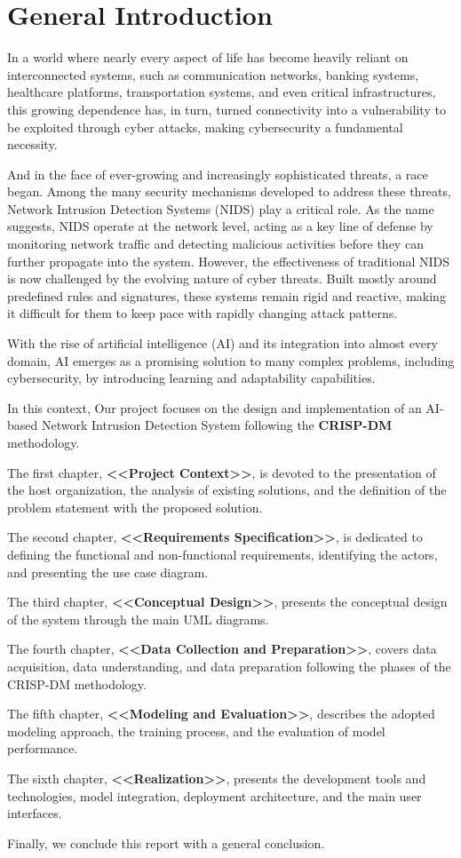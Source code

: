 
\chapter*{General Introduction}

\vspace{-0.9cm}
In a world where nearly every aspect of life has become heavily reliant on interconnected systems, such as communication networks, banking systems, healthcare platforms, transportation systems, and even critical infrastructures, this growing dependence has, in turn, turned connectivity into a vulnerability to be exploited through cyber attacks, making cybersecurity a fundamental necessity.

And in the face of ever-growing and increasingly sophisticated threats, a race began. Among the many security mechanisms developed to address these threats, Network Intrusion Detection Systems (NIDS) play a critical role. As the name suggests, NIDS operate at the network level, acting as a key line of defense by monitoring network traffic and detecting malicious activities before they can further propagate into the system.
  However, the effectiveness of traditional NIDS is now challenged by the evolving nature of cyber threats. Built mostly around predefined rules and signatures, these systems remain rigid and reactive, making it difficult for them to keep pace with rapidly changing attack patterns.  

With the rise of artificial intelligence (AI) and its integration into almost every domain, AI emerges as a promising solution to many complex problems, including cybersecurity, by introducing learning and adaptability capabilities.

In this context, Our project focuses on the design and implementation of an AI-based Network Intrusion Detection System following the \textbf{CRISP-DM}\cite{CRISP} methodology.

The first chapter, \textbf{<<Project Context>>}, is devoted to the presentation of the host organization, the analysis of existing solutions, and the definition of the problem statement with the proposed solution.

The second chapter, \textbf{<<Requirements Specification>>}, is dedicated to defining the functional and non-functional requirements, identifying the actors, and presenting the use case diagram.

The third chapter, \textbf{<<Conceptual Design>>}, presents the conceptual design of the system through the main UML\cite{UML} diagrams.

The fourth chapter, \textbf{<<Data Collection and Preparation>>}, covers data acquisition, data understanding, and data preparation following the phases of the CRISP-DM methodology.

The fifth chapter, \textbf{<<Modeling and Evaluation>>}, describes the adopted modeling approach, the training process, and the evaluation of model performance.

The sixth chapter, \textbf{<<Realization>>}, presents the development tools and technologies, model integration, deployment architecture, and the main user interfaces.

Finally, we conclude this report with a general conclusion.